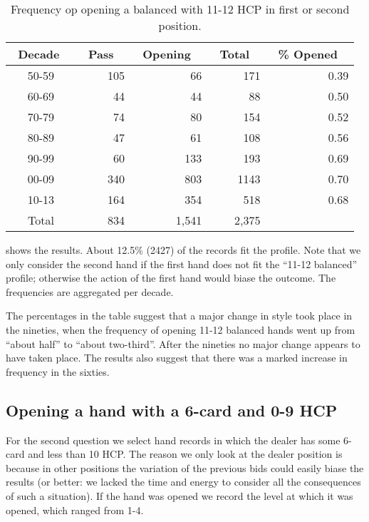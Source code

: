 \documentclass{llncs}
\begin{document}
\begin{table}
\caption{Frequency op opening a balanced with 11-12 HCP in first
  or second position.}
\label{tbl:opening-11-12-bal-2}
\centering\footnotesize
\begin{tabular}{|c|r|r|r|r|}
\hline
\bf \ Decade \ & \bf \ Pass \ & \bf \ Opening \ & \bf \ Total \  & 
\bf \ \% Opened \ \\ \hline 
50-59 & 105 & 66 & 171 & 0.39\\
60-69 & 44 & 44 & 88 & 0.50\\
70-79 & 74 & 80 & 154 & 0.52\\
80-89 & 47 & 61 & 108 & 0.56\\
90-99 & 60 & 133 & 193 & 0.69\\
00-09 & 340 & 803 & 1143 & 0.70\\
10-13 & 164 & 354 & 518 & 0.68 \\ 
\hline
Total & 834 & 1,541 & 2,375 & \\ 
\hline
\end{tabular}
\end{table}

 shows the results. About 12.5\% (2427) of
the records fit the profile. Note that we only consider the second
hand if the first hand does not fit the ``11-12 balanced'' profile;
otherwise the action of the first hand would biase the outcome.  The
frequencies are aggregated per decade.

The percentages in the table suggest that a major change in style took
place in the nineties, when the frequency of opening 11-12 balanced
hands went up from ``about half'' to ``about two-third''. After the
nineties no major change appears to have taken place.  The results
also suggest that there was a marked increase in frequency in the
sixties.
 
\subsection{Opening a hand with a  6-card and 0-9 HCP}

For the second question we select hand records in which the dealer has
some 6-card and less than 10 HCP. The reason we only look at the
dealer position is because in other positions the variation of the
previous bids could easily biase the results (or better: we lacked the
time and energy to consider all the consequences of such a situation).
If the hand was opened we record the level at which it was opened,
which ranged from 1-4.
\end{document}
